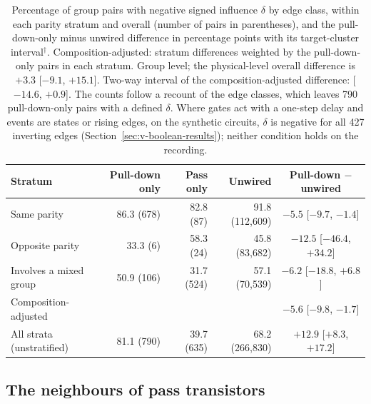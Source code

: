 \begin{table}[tbp]
  \centering
  \footnotesize
  \caption[Negative signed influence within parity strata]{Percentage of group pairs with negative signed influence $\delta$ by edge class, within each parity stratum and overall (number of pairs in parentheses), and the pull-down-only minus unwired difference in percentage points with its target-cluster interval$^{\dagger}$. Composition-adjusted: stratum differences weighted by the pull-down-only pairs in each stratum. Group level; the physical-level overall difference is $+3.3$ [$-9.1$, $+15.1$]. Two-way interval of the composition-adjusted difference: [$-14.6$, $+0.9$]. The counts follow a recount of the edge classes, which leaves 790 pull-down-only pairs with a defined $\delta$. Where gates act with a one-step delay and events are states or rising edges, on the synthetic circuits, $\delta$ is negative for all 427 inverting edges (Section~\ref{sec:v-boolean-results}); neither condition holds on the recording.}
  \label{tab:r1-h4}
  \begin{tabular}{@{}lrrrc@{}}
    \toprule
    Stratum & Pull-down only & Pass only & Unwired & Pull-down $-$ unwired \\
    \midrule
    Same parity & 86.3 (678) & 82.8 (87) & 91.8 (112,609) & $-5.5$ [$-9.7$, $-1.4$] \\
    Opposite parity & 33.3 (6) & 58.3 (24) & 45.8 (83,682) & $-12.5$ [$-46.4$, $+34.2$] \\
    Involves a mixed group & 50.9 (106) & 31.7 (524) & 57.1 (70,539) & $-6.2$ [$-18.8$, $+6.8$] \\
    Composition-adjusted & & & & $-5.6$ [$-9.8$, $-1.7$] \\
    \addlinespace
    All strata (unstratified) & 81.1 (790) & 39.7 (635) & 68.2 (266,830) & $+12.9$ [$+8.3$, $+17.2$] \\
    \bottomrule
  \end{tabular}
\end{table}

\subsection{The neighbours of pass transistors}
\label{sec:r1-relation}

